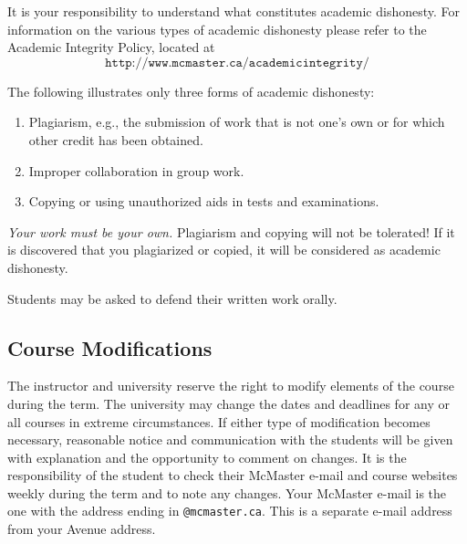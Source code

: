 \documentclass[12pt]{article}
\newcommand{\be}{\begin{enumerate}}
\newcommand{\ee}{\end{enumerate}}
\begin{document}
It is your responsibility to understand what constitutes academic dishonesty.
For information on the various types of academic dishonesty please refer to the
Academic Integrity Policy, located at
\[\texttt{http://www.mcmaster.ca/academicintegrity/}\]

\noindent The following illustrates only three forms of academic dishonesty:

\be

\item Plagiarism, e.g., the submission of work that is not one's own or for
  which other credit has been obtained.

\item Improper collaboration in group work.

\item Copying or using unauthorized aids in tests and examinations.

  \ee

\emph{Your work must be your own.}  Plagiarism and copying will not be
tolerated!  If it is discovered that you plagiarized or copied, it
will be considered as academic dishonesty.

Students may be asked to defend their written work orally.

\subsection*{Course Modifications}

The instructor and university reserve the right to modify elements of
the course during the term.  The university may change the dates and
deadlines for any or all courses in extreme circumstances.  If either
type of modification becomes necessary, reasonable notice and
communication with the students will be given with explanation and the
opportunity to comment on changes. It is the responsibility of the
student to check their McMaster e-mail and course websites weekly
during the term and to note any changes.  Your McMaster e-mail is the
one with the address ending in \texttt{@mcmaster.ca}.  This is a
separate e-mail address from your Avenue address.
\end{document}
